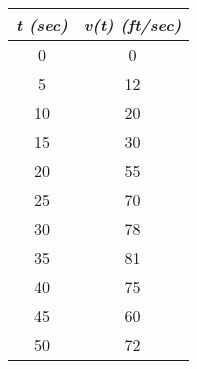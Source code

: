   \begin{marginfigure}[10pt]
    \hfill{\begin{tabular}{|c|c|}
      \hline
      \textit{t (sec)}&\textit{v(t) (ft/sec)} \\
      \hline
      0&0   \\
      5&12  \\
      10&20 \\
      15&30 \\
      20&55 \\
      25&70 \\
      30&78 \\
      35&81 \\
      40&75 \\
      45&60 \\
      50&72 \\
      \hline
    \end{tabular}}
  \end{marginfigure}
\ifprintanswers
\fi 

